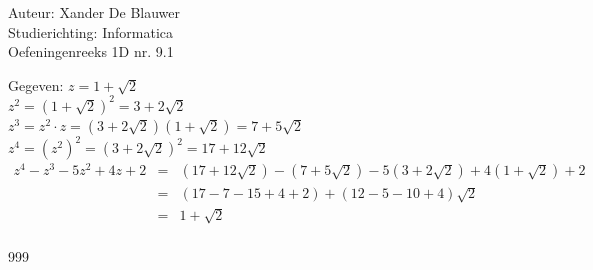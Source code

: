 \documentclass[a4paper]{article}
\begin{document}
\noindent \large Auteur: Xander De Blauwer \\
\noindent \large Studierichting: Informatica\\
\noindent \large Oefeningenreeks 1D nr. 9.1\\

\medskip

\normalsize



Gegeven: $ z = 1+\sqrt{2}$ \\

$z^2 = (1+\sqrt{2})^2 = 3 + 2\sqrt{2}$ \\

$z^3 = z^2 \cdot z = (3 + 2\sqrt{2})(1+\sqrt{2}) = 7 + 5\sqrt{2}$ \\

$z^4 = (z^2)^2 = (3 + 2\sqrt{2})^2 = 17 + 12\sqrt{2}$ \\


\begin{eqnarray*}
z^4 - z^3 - 5z^2 + 4z + 2
&=& (17 + 12\sqrt{2}) - (7 + 5\sqrt{2}) - 5(3 + 2\sqrt{2}) + 4(1+\sqrt{2}) + 2 \\
&=& (17 - 7 - 15 + 4 + 2) + (12 - 5 - 10 + 4)\sqrt{2} \\
&=& 1 + \sqrt{2} \\
\end{eqnarray*}





\begin{thebibliography}{999}
\end{thebibliography}
\end{document}
